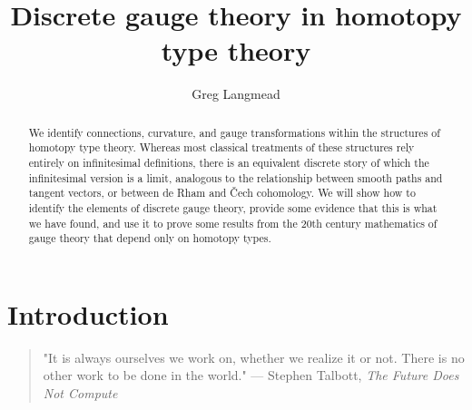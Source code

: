 \documentclass[12pt]{article}
\title{Discrete gauge theory in homotopy type theory}
\author{Greg Langmead}
\begin{document}
\begin{abstract}
We identify connections, curvature, and gauge transformations within the structures of homotopy type theory. Whereas most classical treatments of these structures rely entirely on infinitesimal definitions, there is an equivalent discrete story of which the infinitesimal version is a limit, analogous to the relationship between smooth paths and tangent vectors, or between de Rham and Čech cohomology. We will show how to identify the elements of discrete gauge theory, provide some evidence that this is what we have found, and use it to prove some results from the 20th century mathematics of gauge theory that depend only on homotopy types.
\end{abstract}


\section{Introduction}
\begin{quote} 
\centering 
"It is always ourselves we work on, whether we realize it or not. There is no other work to be done in the world." --- Stephen Talbott, \emph{The Future Does Not Compute}\cite{talbott}
\end{quote}
\end{document}
